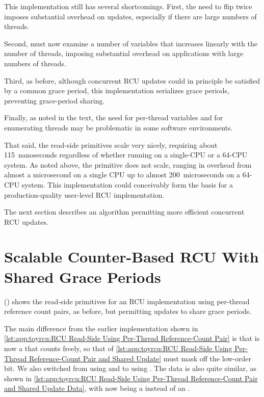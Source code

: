 This implementation still has several shortcomings.
First, the need to flip  twice imposes substantial overhead
on updates, especially if there are large numbers of threads.

Second,  must now examine a number of variables
that increases linearly with the number of threads, imposing substantial
overhead on applications with large numbers of threads.

Third, as before, although concurrent RCU updates could in principle
be satisfied by a common grace period, this implementation serializes
grace periods, preventing grace-period sharing.

Finally, as noted in the text, the need for per-thread variables
and for enumerating threads may be problematic in some software
environments.

That said, the read-side primitives scale very nicely, requiring about
115~nanoseconds regardless of whether running on a single-CPU or a 64-CPU
 system.
As noted above, the  primitive does not scale,
ranging in overhead from almost a microsecond on a single  CPU
up to almost 200~microseconds on a 64-CPU system.
This implementation could conceivably form the basis for a
production-quality user-level RCU implementation.

The next section describes an algorithm permitting more efficient
concurrent RCU updates.

\section{Scalable Counter-Based RCU With Shared Grace Periods}
\label{sec:app:toyrcu:Scalable Counter-Based RCU With Shared Grace Periods}

()
shows the read-side primitives for an RCU implementation using per-thread
reference count pairs, as before, but permitting updates to share
grace periods.
\begin{fcvref}
The main difference from the earlier implementation shown in
\cref{lst:app:toyrcu:RCU Read-Side Using Per-Thread Reference-Count Pair}
is that  is now a  that counts freely,
so that  of
\cref{lst:app:toyrcu:RCU Read-Side Using Per-Thread Reference-Count Pair and Shared Update}
must mask off the low-order bit.
We also switched from using  and 
to using .
The data is also quite similar, as shown in
\cref{lst:app:toyrcu:RCU Read-Side Using Per-Thread Reference-Count Pair and Shared Update Data},
with  now being a  instead of an
.
\end{fcvref}

